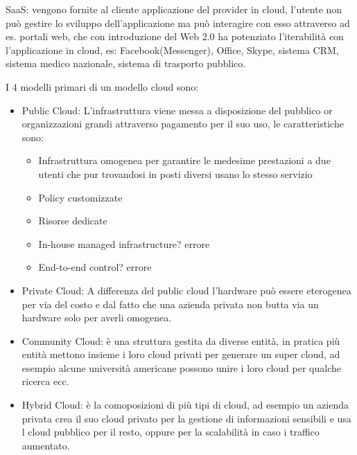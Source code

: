 \documentclass[11pt, twocolumn]{article}
\begin{document}
SaaS: vengono fornite al cliente applicazione del provider in cloud, l'utente non può gestire lo sviluppo dell'applicazione ma può interagire con esso attraverso ad es. portali web, che con introduzione del Web 2.0 ha potenziato l'iterabilità con l'applicazione in cloud, es: Facebook(Messenger), Office, Skype, sistema CRM, sistema medico nazionale, sistema di trasporto pubblico.

I 4 modelli primari di un modello cloud sono:
\begin{itemize}
	\item Public Cloud: L'infrastruttura viene messa a disposizione del pubblico or organizzazioni grandi attraverso pagamento per il suo uso, le caratteristiche sono:
	\begin{itemize}
		\item Infrastruttura omogenea per garantire le medesime prestazioni a due utenti che pur trovandosi in posti diversi usano lo stesso servizio
		\item Policy customizzate
		\item Risorse dedicate
		\item In-house managed infrastructure? errore
		\item End-to-end control? errore
	\end{itemize} 
	\item Private Cloud:
	A differenza del public cloud l'hardware può essere eterogenea per via del costo e dal fatto che una azienda privata non butta via un hardware solo per averli omogenea.
	\item Community Cloud: è una struttura gestita da diverse entità, in pratica più entità mettono insieme i loro cloud privati per generare un super cloud, ad esempio alcune università americane possono unire i loro cloud per qualche ricerca ecc.
	\item Hybrid Cloud: è la comoposizioni di più tipi di cloud, ad esempio un azienda privata crea il suo cloud privato per la gestione di informazioni sensibili e usa l cloud pubblico per il resto, oppure per la scalabilità in caso i traffico aumentato.
\end{itemize}
\end{document}
